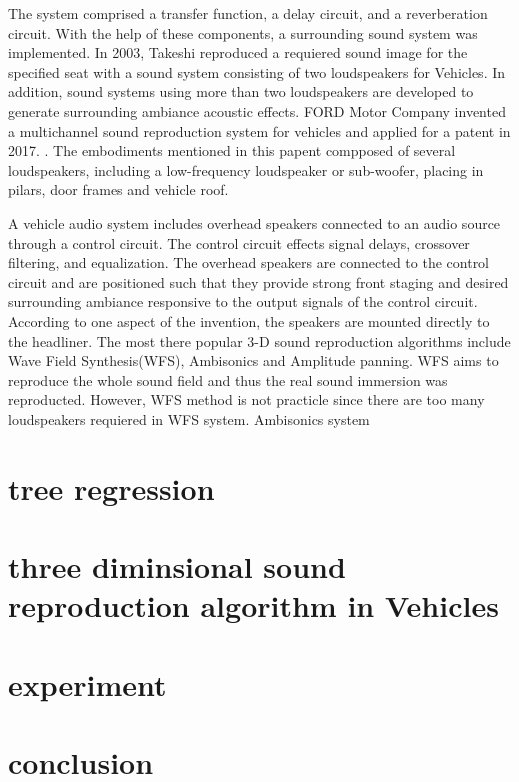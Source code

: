 \documentclass[runningheads,a4paper]{llncs}
\begin{document}
The system comprised a transfer function, a delay circuit, and a reverberation circuit. With the help of these components, a surrounding sound system was implemented. In 2003, Takeshi reproduced a requiered sound image for the specified seat with a sound system consisting of two loudspeakers for Vehicles\cite{Takeshi03}. In addition, sound systems using more than two loudspeakers are developed to generate surrounding ambiance acoustic effects\cite{clark1998vehicle}\cite{orellana2015loudspeaker}. FORD Motor Company invented a multichannel sound reproduction system for vehicles and applied for a patent in 2017. \cite{orellana2015loudspeaker}. The embodiments mentioned in this papent compposed of several loudspeakers, including a low-frequency loudspeaker or sub-woofer, placing in pilars, door frames and vehicle roof. 

A vehicle audio system includes overhead speakers connected to an audio source through a control circuit. The control circuit effects signal delays, crossover filtering, and equalization. The overhead speakers are connected to the control circuit and are positioned such that they provide strong front staging and desired surrounding ambiance responsive to the output signals of the control circuit. According to one aspect of the invention, the speakers are mounted directly to the headliner.
The most there popular 3-D sound reproduction algorithms include Wave Field Synthesis(WFS), Ambisonics and Amplitude panning. WFS aims to reproduce the whole sound field and thus the real sound immersion was reproducted. However, WFS method is not practicle since there are too many loudspeakers requiered in WFS system. Ambisonics system  


\section{tree regression}\label{sec:regression}

\section{three diminsional sound reproduction algorithm in Vehicles}\label{sec:algorithm}

\section{experiment}\label{sec:experiment}

\section{conclusion}\label{sec:conclusion}

\label{bib:bibliography}



\end{document}
